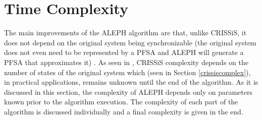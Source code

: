 {%
%
%
%
\section{Time Complexity}

The main improvements of the ALEPH algorithm are that, unlike CRISSiS, it does not depend on the original system being synchronizable (the original system does not even need to be represented by a PFSA and ALEPH will generate a PFSA that approximates it) . As seen in \citep{asok.11}, CRISSiS complexity depends on the number of states of the original system which (seen in Section \ref{crissiscomplex}), in practical applications, remains unknown until the end of the algorithm. As it is discussed in this section, the complexity of ALEPH depends only on parameters known prior to the algorithm execution. The complexity of each part of the algorithm is discussed individually and a final complexity is given in the end.

}
